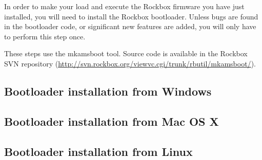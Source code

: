 
In order to make your \archosplayertype{} load and execute the Rockbox
firmware you have just installed, you will need to install the
Rockbox bootloader. Unless bugs are found in the bootloader code, or
significant new features are added, you will only have to perform this
step once.

These steps use the mkamsboot tool. Source code is available in the
Rockbox SVN repository
(\url{http://svn.rockbox.org/viewvc.cgi/trunk/rbutil/mkamsboot/}).

\subsection{Bootloader installation from Windows}

\begin{enumerate}


\end{enumerate}

\subsection{Bootloader installation from Mac OS X}

\begin{enumerate}


\end{enumerate}

\subsection{Bootloader installation from Linux}

\begin{enumerate}


\end{enumerate}
